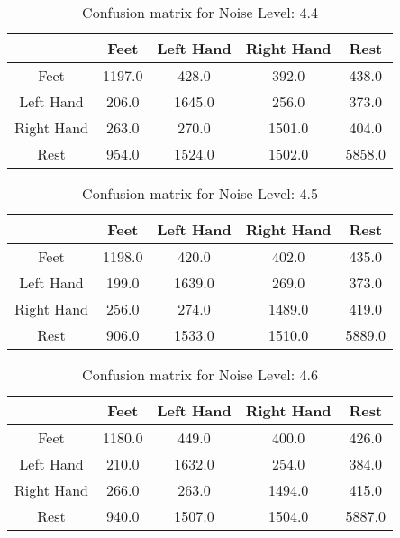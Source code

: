 \begin{table}[!htbp]
    \centering
    \begin{tabular}{|c||c|c|c|c|}
        \hline
		 & Feet & Left Hand & Right Hand & Rest \\
        \hline
        \hline
        Feet & 1197.0 & 428.0 & 392.0 & 438.0 \\
        \hline
        Left Hand & 206.0 & 1645.0 & 256.0 & 373.0 \\
        \hline
        Right Hand & 263.0 & 270.0 & 1501.0 & 404.0 \\
        \hline
        Rest & 954.0 & 1524.0 & 1502.0 & 5858.0 \\
        \hline
    \end{tabular}
    \caption{Confusion matrix for Noise Level: 4.4}
\end{table}

\begin{table}[!htbp]
    \centering
    \begin{tabular}{|c||c|c|c|c|}
        \hline
		 & Feet & Left Hand & Right Hand & Rest \\
        \hline
        \hline
        Feet & 1198.0 & 420.0 & 402.0 & 435.0 \\
        \hline
        Left Hand & 199.0 & 1639.0 & 269.0 & 373.0 \\
        \hline
        Right Hand & 256.0 & 274.0 & 1489.0 & 419.0 \\
        \hline
        Rest & 906.0 & 1533.0 & 1510.0 & 5889.0 \\
        \hline
    \end{tabular}
    \caption{Confusion matrix for Noise Level: 4.5}
\end{table}

\begin{table}[!htbp]
    \centering
    \begin{tabular}{|c||c|c|c|c|}
        \hline
		 & Feet & Left Hand & Right Hand & Rest \\
        \hline
        \hline
        Feet & 1180.0 & 449.0 & 400.0 & 426.0 \\
        \hline
        Left Hand & 210.0 & 1632.0 & 254.0 & 384.0 \\
        \hline
        Right Hand & 266.0 & 263.0 & 1494.0 & 415.0 \\
        \hline
        Rest & 940.0 & 1507.0 & 1504.0 & 5887.0 \\
        \hline
    \end{tabular}
    \caption{Confusion matrix for Noise Level: 4.6}
\end{table}

